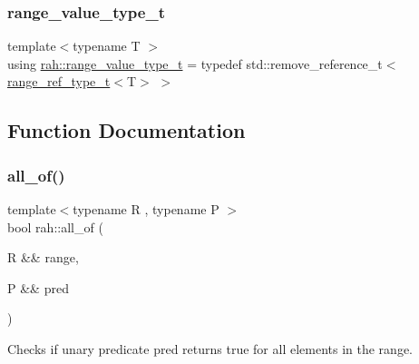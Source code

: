\subsubsection{\texorpdfstring{range\_value\_type\_t}{range\_value\_type\_t}}
{\footnotesize\ttfamily template$<$typename T $>$ \\
using \mbox{\hyperlink{namespacerah_a4b32e39fb106af7036b20a39c4f024c1}{rah\+::range\+\_\+value\+\_\+type\+\_\+t}} = typedef std\+::remove\+\_\+reference\+\_\+t$<$\mbox{\hyperlink{namespacerah_a6622426bea22e9509614fe4c574ebeca}{range\+\_\+ref\+\_\+type\+\_\+t}}$<$T$>$ $>$}



\subsection{Function Documentation}
\mbox{\label{namespacerah_aaf7abb6066c8adfe6959691c3a3ea4e2}} 
\subsubsection{\texorpdfstring{all\_of()}{all\_of()}\hspace{0.1cm}{\footnotesize\ttfamily [1/2]}}
{\footnotesize\ttfamily template$<$typename R , typename P $>$ \\
bool rah\+::all\+\_\+of (\begin{DoxyParamCaption}\item[{R \&\&}]{range,  }\item[{P \&\&}]{pred }\end{DoxyParamCaption})}



Checks if unary predicate pred returns true for all elements in the range. 


\begin{DoxyCodeInclude}{0}
\DoxyCodeLine{    );}
\end{DoxyCodeInclude}
\mbox{\label{namespacerah_a4066165c960917a330beeed75a0f96e7}} 
